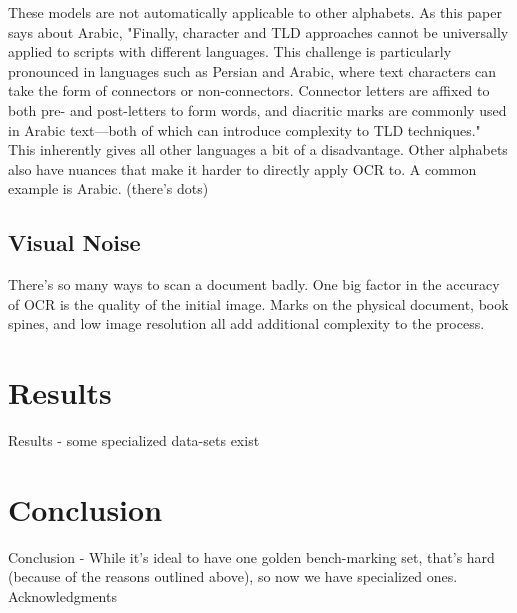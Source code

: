 \documentclass[sigplan,screen,nonacm]{acmart-tagged}
\begin{document}
These models are not automatically applicable to other alphabets. As this paper\cite{Fateh:2024} says about Arabic, "Finally, character and TLD approaches cannot be universally applied to scripts with different languages. This challenge is particularly pronounced in languages such as Persian and Arabic, where text characters can take the form of connectors or non-connectors. Connector letters are affixed to both pre- and post-letters to form words, and diacritic marks are commonly used in Arabic text—both of which can introduce complexity to TLD techniques." This inherently gives all other languages a bit of a disadvantage. Other alphabets also have nuances that make it harder to directly apply OCR to. A common example is Arabic. (there's dots) \cite{Fateh:2024, Hegghamer:2022}

\subsection{Visual Noise}
\label{sec:Noise}

There's so many ways to scan a document badly. \cite{Hegghamer:2022}
One big factor in the accuracy of OCR is the quality of the initial image. Marks on the physical document, book spines, and low image resolution all add additional complexity to the process. 

\section{Results}
\label{sec:Results}

Results - some specialized data-sets exist \cite{Fateh:2024,Hegghamer:2022}

\section{Conclusion}
\label{sec:Conclusion}

Conclusion - While it's ideal to have one golden bench-marking set, that's hard (because of the reasons outlined above), so now we have specialized ones.
Acknowledgments

\end{document}
